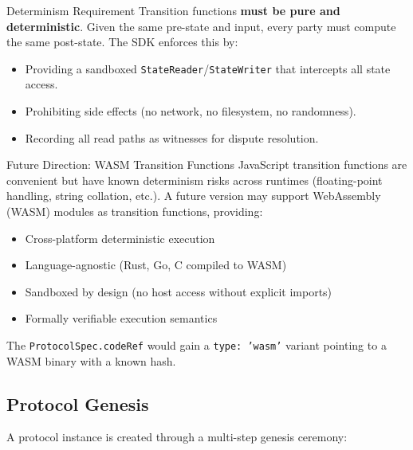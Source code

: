 \documentclass[11pt,a4paper]{article}
\begin{document}
\begin{defbox}{Determinism Requirement}
Transition functions \textbf{must be pure and deterministic}. Given the same
pre-state and input, every party must compute the same post-state. The SDK
enforces this by:
\begin{itemize}[nosep]
  \item Providing a sandboxed \texttt{StateReader}/\texttt{StateWriter} that
    intercepts all state access.
  \item Prohibiting side effects (no network, no filesystem, no randomness).
  \item Recording all read paths as witnesses for dispute resolution.
\end{itemize}
\end{defbox}

\begin{researchbox}{Future Direction: WASM Transition Functions}
JavaScript transition functions are convenient but have known determinism
risks across runtimes (floating-point handling, string collation, etc.). A
future version may support WebAssembly (WASM) modules as transition functions,
providing:
\begin{itemize}[nosep]
  \item Cross-platform deterministic execution
  \item Language-agnostic (Rust, Go, C compiled to WASM)
  \item Sandboxed by design (no host access without explicit imports)
  \item Formally verifiable execution semantics
\end{itemize}
The \texttt{ProtocolSpec.codeRef} would gain a \texttt{type: 'wasm'} variant
pointing to a WASM binary with a known hash.
\end{researchbox}


\subsection{Protocol Genesis}
\label{sec:genesis}

A protocol instance is created through a multi-step genesis ceremony:
\end{document}

